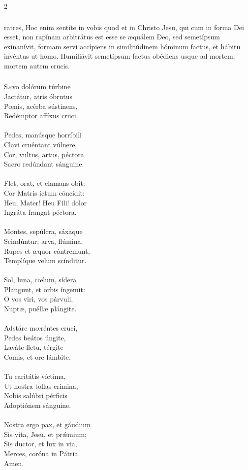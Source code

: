 \documentclass[9pt,twoside]{extarticle}
\begin{document}
\begin{multicols}{2}
\subsubsection*{}
ratres, Hoc enim sentíte in vobis quod et in Christo Jesu, qui cum in forma Dei esset, non rapínam arbitrátus est esse se æquálem Deo, sed semetípsum exinanívit, formam servi accípiens in similitúdinem hóminum factus, et hábitu invéntus ut homo. Humiliávit semetípsum factus obédiens usque ad mortem, mortem autem crucis.

\subsubsection*{\center{}}
\lettrine{S}ævo dolórum túrbine\\
Jactátur, atris óbrutus\\
Pœnis, acérba sústinens,\\
Redémptor affíxus cruci.\\
\\
Pedes, manúsque horríbili\\
Clavi cruéntant vúlnere,\\
Cor, vultus, artus, péctora\\
Sacro redúndant sánguine.\\
\\
Flet, orat, et clamans obit:\\
Cor Matris ictum cóncidit:\\
Heu, Mater! Heu Fili! dolor\\
Ingráta frangat péctora.\\
\\
Montes, sepúlcra, sáxaque\\
Scindúntur; arva, flúmina,\\
Rupes et æquor cóntremunt,\\
Templíque velum scínditur.\\
\\
Sol, luna, cœlum, sídera\\
Plangunt, et orbis íngemit:\\
O vos viri, vos párvuli,\\
Nuptæ, puéllæ plángite.\\
\\
Adstáre mœréntes cruci,\\
Pedes beátos úngite,\\
Laváte fletu, térgite\\
Comis, et ore lámbite.\\
\\
Tu caritátis víctima,\\
Ut nostra tollas crímina,\\
Nobis salúbri pérficis\\
Adoptiónem sánguine.\\
\\
Nostra ergo pax, et gáudium\\
Sis vita, Jesu, et prǽmium;\\
Sis ductor, et lux in via,\\
Merces, coróna in Pátria.\\
Amen.


\end{multicols}
\end{document}
